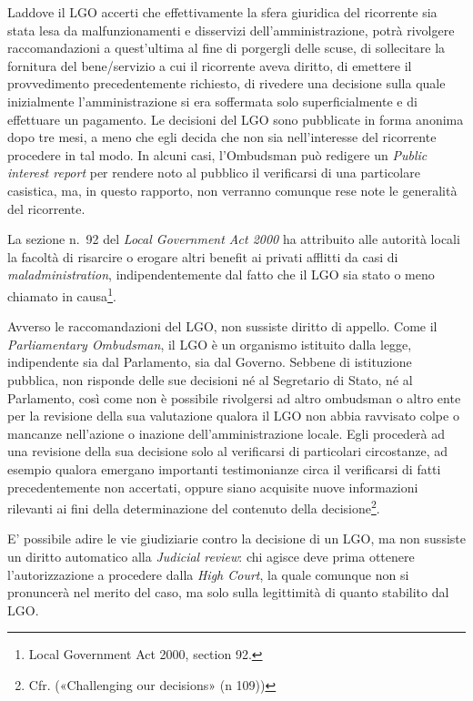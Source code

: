 \documentclass[12pt,it,a4paper,]{report}
\begin{document}
Laddove il LGO accerti che effettivamente la sfera giuridica del
ricorrente sia stata lesa da malfunzionamenti e disservizi
dell'amministrazione, potrà rivolgere raccomandazioni a quest'ultima al
fine di porgergli delle scuse, di sollecitare la fornitura del
bene/servizio a cui il ricorrente aveva diritto, di emettere il
provvedimento precedentemente richiesto, di rivedere una decisione sulla
quale inizialmente l'amministrazione si era soffermata solo
superficialmente e di effettuare un pagamento. Le decisioni del LGO sono
pubblicate in forma anonima dopo tre mesi, a meno che egli decida che
non sia nell'interesse del ricorrente procedere in tal modo. In alcuni
casi, l'Ombudsman può redigere un \emph{Public interest report} per
rendere noto al pubblico il verificarsi di una particolare casistica,
ma, in questo rapporto, non verranno comunque rese note le generalità
del ricorrente.

La sezione n.~92 del \emph{Local Government Act 2000} ha attribuito alle
autorità locali la facoltà di risarcire o erogare altri benefit ai
privati afflitti da casi di \emph{maladministration}, indipendentemente
dal fatto che il LGO sia stato o meno chiamato in causa\footnote{Local
  Government Act 2000, section 92.}.

Avverso le raccomandazioni del LGO, non sussiste diritto di appello.
Come il \emph{Parliamentary Ombudsman}, il LGO è un organismo istituito
dalla legge, indipendente sia dal Parlamento, sia dal Governo. Sebbene
di istituzione pubblica, non risponde delle sue decisioni né al
Segretario di Stato, né al Parlamento, così come non è possibile
rivolgersi ad altro ombudsman o altro ente per la revisione della sua
valutazione qualora il LGO non abbia ravvisato colpe o mancanze
nell'azione o inazione dell'amministrazione locale. Egli procederà ad
una revisione della sua decisione solo al verificarsi di particolari
circostanze, ad esempio qualora emergano importanti testimonianze circa
il verificarsi di fatti precedentemente non accertati, oppure siano
acquisite nuove informazioni rilevanti ai fini della determinazione del
contenuto della decisione\footnote{Cfr. ({«Challenging our decisions»}
  (n 109))}.

E' possibile adire le vie giudiziarie contro la decisione di un LGO, ma
non sussiste un diritto automatico alla \emph{Judicial review}: chi
agisce deve prima ottenere l'autorizzazione a procedere dalla \emph{High
Court}, la quale comunque non si pronuncerà nel merito del caso, ma solo
sulla legittimità di quanto stabilito dal LGO.
\end{document}
